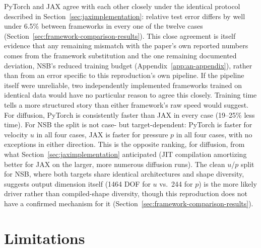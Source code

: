 PyTorch and JAX agree with each other closely under the identical protocol
described in Section~\ref{sec:jaximplementation}: relative test error
differs by well under 6.5\% between frameworks in every one of the twelve
cases (Section~\ref{sec:framework-comparison-results}). This close
agreement is itself evidence that any remaining mismatch with the paper's
own reported numbers comes from the framework substitution and the one
remaining documented deviation, NSB's reduced training budget
(Appendix~\ref{app:an-appendix}), rather than from an error specific to
this reproduction's own pipeline. If the pipeline itself were unreliable,
two independently implemented frameworks trained on identical data would
have no particular reason to agree this closely. Training time tells a
more structured story than either framework's raw speed would suggest. For
diffusion, PyTorch is consistently faster than JAX in every case
(19--25\% less time). For NSB the split is not case- but target-dependent:
PyTorch is faster for velocity $u$ in all four cases, JAX is faster for
pressure $p$ in all four cases, with no exceptions in either direction.
This is the opposite ranking, for diffusion, from what
Section~\ref{sec:jaximplementation} anticipated (JIT compilation
amortizing better for JAX on the larger, more numerous diffusion runs).
The clean $u$/$p$ split for NSB, where both targets share identical
architectures and shape diversity, suggests output dimension itself (1464
DOF for $u$ vs.\ 244 for $p$) is the more likely driver rather than
compiled-shape diversity, though this reproduction does not have a
confirmed mechanism for it (Section~\ref{sec:framework-comparison-results}).

\section{Limitations}

